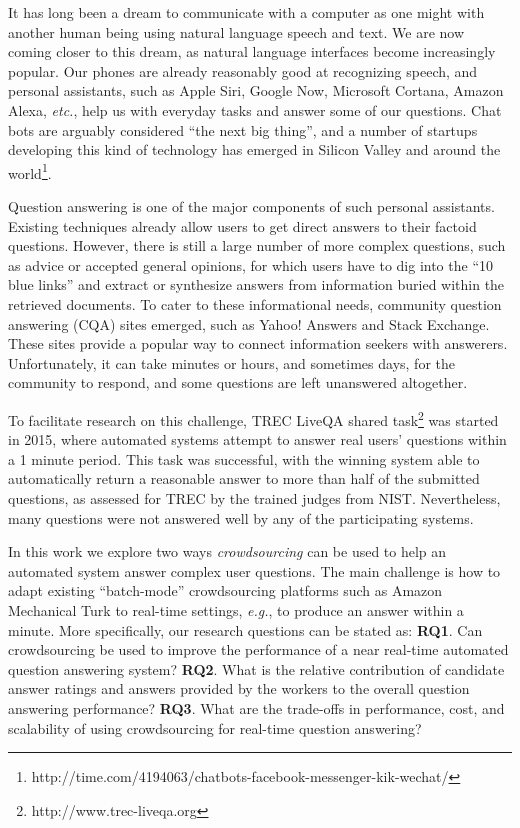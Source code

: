 It has long been a dream to communicate with a computer as one might with another human being using natural language speech and text.
We are now coming closer to this dream, as natural language interfaces become increasingly popular.
Our phones are already reasonably good at recognizing speech, and personal assistants, such as Apple Siri, Google Now, Microsoft Cortana, Amazon Alexa, \textit{etc.}, help us with everyday tasks and answer some of our questions.
Chat bots are arguably considered ``the next big thing'', and a number of startups developing this kind of technology has emerged in Silicon Valley and around the world\footnote{http://time.com/4194063/chatbots-facebook-messenger-kik-wechat/}.

Question answering is one of the major components of such personal assistants.
Existing techniques already allow users to get direct answers to their factoid questions.
However, there is still a large number of more complex questions, such as advice or accepted general opinions, for which users have to dig into the ``10 blue links'' and extract or synthesize answers from information buried within the retrieved documents.
To cater to these informational needs, community question answering (CQA) sites emerged, such as Yahoo! Answers and Stack Exchange.
These sites provide a popular way to connect information seekers with answerers.
Unfortunately, it can take minutes or hours, and sometimes days, for the community to respond, and some questions are left unanswered altogether. 

To facilitate research on this challenge, TREC LiveQA shared task\footnote{http://www.trec-liveqa.org} was started in 2015, where automated systems attempt to answer real users' questions within a 1 minute period.
This task was successful, with the winning system able to automatically return a reasonable answer to more than half of the submitted questions, as assessed for TREC by the trained judges from NIST.
Nevertheless, many questions were not answered well by any of the participating systems.

In this work we explore two ways \textit{crowdsourcing} can be used to help an automated system answer complex user questions.
The main challenge is how to adapt existing ``batch-mode'' crowdsourcing platforms such as Amazon Mechanical Turk to real-time settings, \textit{e.g.}, to produce an answer within a minute.
More specifically, our research questions can be stated as:
\textbf{RQ1}. Can crowdsourcing be used to improve the performance of a near real-time automated question answering system?
\textbf{RQ2}. What is the relative contribution of candidate answer ratings and answers provided by the workers to the overall question answering performance?
\textbf{RQ3}. What are the trade-offs in performance, cost, and scalability of using crowdsourcing for real-time question answering?

